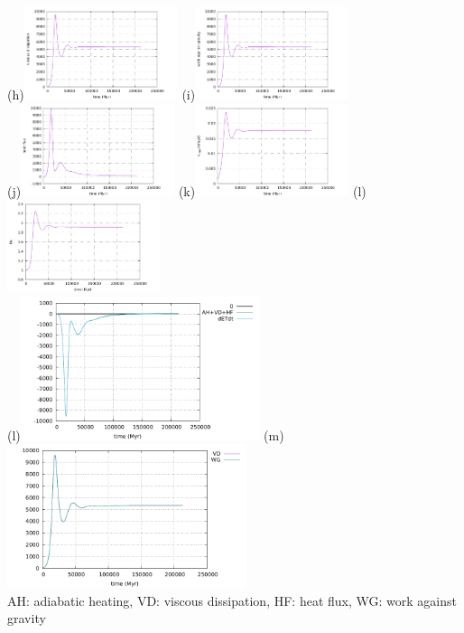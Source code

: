 \begin{center}
(h)\includegraphics[width=4.5cm]{python_codes/fieldstone_24/EBA_104/viscous_dissipation}
(i)\includegraphics[width=4.5cm]{python_codes/fieldstone_24/EBA_104/work_grav}\\
(j)\includegraphics[width=4.5cm]{python_codes/fieldstone_24/EBA_104/heat_flux}
(k)\includegraphics[width=4.5cm]{python_codes/fieldstone_24/EBA_104/vrms}
(l)\includegraphics[width=4.5cm]{python_codes/fieldstone_24/EBA_104/Nu}\\
(l)\includegraphics[width=7cm]{python_codes/fieldstone_24/EBA_104/conservation1}
(m)\includegraphics[width=7cm]{python_codes/fieldstone_24/EBA_104/conservation2}\\
AH: adiabatic heating, VD: viscous dissipation, HF: heat flux, WG: work against gravity
\end{center}

